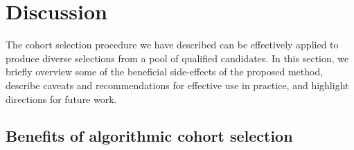\documentclass[12pt]{article}
\begin{document}
\section*{Discussion}
\label{sec:discussion}

\begin{bf}
The cohort selection procedure we have described can be effectively applied to produce diverse selections from a pool of qualified candidates.
In this section, we briefly overview some of the beneficial side-effects of the proposed method, describe caveats and recommendations for effective use in practice, and highlight directions for future work.
\end{bf}

\subsection*{Benefits of algorithmic cohort selection}
\end{document}
